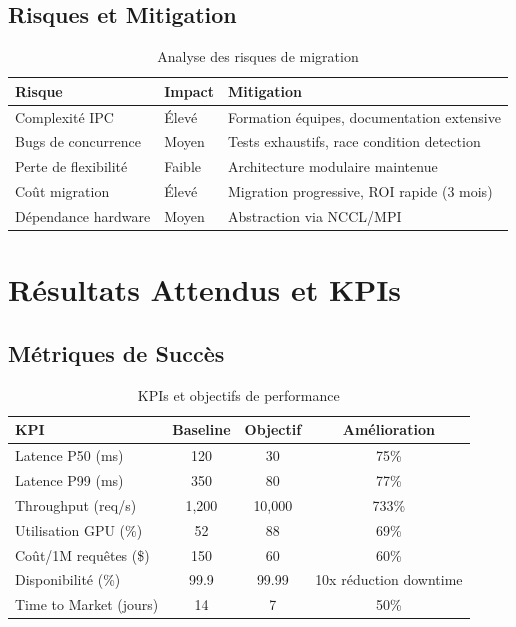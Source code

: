 \documentclass[12pt,a4paper]{article}
\begin{document}
\subsection{Risques et Mitigation}

\begin{table}[H]
\centering
\small
\begin{tabular}{|p{4cm}|p{3cm}|p{5cm}|}
\hline
\textbf{Risque} & \textbf{Impact} & \textbf{Mitigation} \\
\hline
Complexité IPC & Élevé & Formation équipes, documentation extensive \\
\hline
Bugs de concurrence & Moyen & Tests exhaustifs, race condition detection \\
\hline
Perte de flexibilité & Faible & Architecture modulaire maintenue \\
\hline
Coût migration & Élevé & Migration progressive, ROI rapide (3 mois) \\
\hline
Dépendance hardware & Moyen & Abstraction via NCCL/MPI \\
\hline
\end{tabular}
\caption{Analyse des risques de migration}
\end{table}

\section{Résultats Attendus et KPIs}

\subsection{Métriques de Succès}

\begin{table}[H]
\centering
\begin{tabular}{|l|c|c|c|}
\hline
\textbf{KPI} & \textbf{Baseline} & \textbf{Objectif} & \textbf{Amélioration} \\
\hline
Latence P50 (ms) & 120 & 30 & 75\% \\
\hline
Latence P99 (ms) & 350 & 80 & 77\% \\
\hline
Throughput (req/s) & 1,200 & 10,000 & 733\% \\
\hline
Utilisation GPU (\%) & 52 & 88 & 69\% \\
\hline
Coût/1M requêtes (\$) & 150 & 60 & 60\% \\
\hline
Disponibilité (\%) & 99.9 & 99.99 & 10x réduction downtime \\
\hline
Time to Market (jours) & 14 & 7 & 50\% \\
\hline
\end{tabular}
\caption{KPIs et objectifs de performance}
\end{table}
\end{document}
